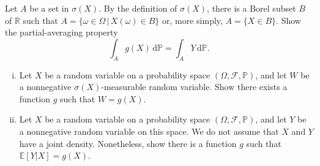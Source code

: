 \documentclass[11pt]{article}
\newcommand\E{\mathbb{E}}
\newcommand\R{\mathbb{R}}
\renewcommand\P{\mathbb{P}} %
\newcommand\cF{\mathcal{F}}
\newcounter{question}[section]
\begin{document}
\begin{hwquestion}
        Let $A$ be a set in $\sigma(X)$. By the definition of $\sigma(X)$, there is a Borel
        subset $B$ of $\R$ such that $A = \{ \omega \in \Omega \, | \, X(\omega) \in B \}$
        or, more simply, $A = \{ X \in B \}$. Show the partial-averaging property
        \[
            \int_{A} g(X) \, \text{d} \P
            =
            \int_{A} Y \, \text{d} \P.
        \]
    \end{hwquestion}





    \begin{hwquestion}
        \begin{enumerate}[(i), nolistsep]
            \item Let $X$ be a random variable on a probability space $(\Omega, \cF, \P)$,
            and let $W$ be a nonnegative $\sigma(X)$-measurable random variable. Show there
            exists a function $g$ such that $W = g(X)$.

            \item Let $X$ be a random variable on a probability space $(\Omega, \cF, \P)$,
            and let $Y$ be a nonnegative random variable on this space. We do not assume
            that $X$ and $Y$ have a joint density. Nonetheless, show there is a function $g$
            such that $\E[Y | X] = g(X)$.
        \end{enumerate}
    \end{hwquestion}
\end{document}

